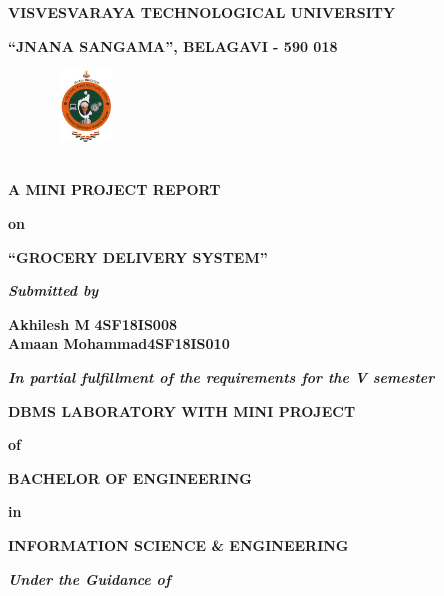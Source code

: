 \documentclass[12pt,a4paper]{report}
\begin{document}
\pagestyle{empty}
\begin{center}
{\large \textbf{VISVESVARAYA TECHNOLOGICAL UNIVERSITY}}
\par
\vspace{3pt}
{\large \textbf{``JNANA SANGAMA'', BELAGAVI - 590 018}}
\begin{figure}[hbtp]
\centering
\includegraphics[width=0.80in,height=0.75in]{../fig/vtu}
\end{figure}
\\
\textbf{A MINI PROJECT REPORT}
\par
\textbf{on}
\par
\vspace{3pt}
{\Large \textbf{``GROCERY DELIVERY SYSTEM''}}
\par
\vspace{8pt}
\textit{\textbf{Submitted by}}
\par
\vspace{6pt}
\textbf{\large Akhilesh M             }\hspace{2.1in}\textbf{\large 4SF18IS008}\\
\textbf{\large Amaan Mohammad}\hspace{1.4in}\textbf{\large 4SF18IS010}\\
\par
\vspace{3pt}
\textit{\textbf{In partial fulfillment of the requirements for the V semester }}
\par
\vspace{0.5pt}
\Large \textbf{DBMS LABORATORY WITH MINI PROJECT}
\par
\vspace{0.5pt}
\normalsize \centering \textbf{of}
\par
\vspace{0.5pt}
\large \textbf{BACHELOR OF ENGINEERING }
\par
\vspace{0.5pt}
\textbf{in}
\par
\vspace{0.5pt}
\large \textbf{INFORMATION SCIENCE \& ENGINEERING}
\par
\vspace{2pt}
\textit{\textbf{Under the Guidance of}}
\par
\vspace{6pt}

\end{center}
\end{document}
